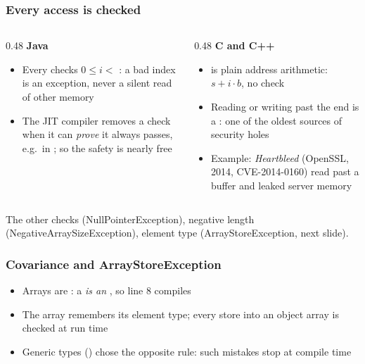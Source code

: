 \documentclass[aspectratio=169,10pt,compress]{beamer}
\begin{document}
\begin{frame}[t,fragile] \frametitle{Every access is checked}
	\begin{columns}[T]
		\begin{column}{0.48\textwidth}
			\textbf{Java}
			\begin{itemize}\small
				\item Every  checks $0 \le i <$ : a bad index is an
				      exception, never a silent read of other memory
				\item The JIT compiler removes a check when it can \emph{prove} it always passes,
				      e.g.\ in ; so the safety is nearly free
			\end{itemize}
		\end{column}
		\begin{column}{0.48\textwidth}
			\textbf{C and C++}
			\begin{itemize}\small
				\item {} is plain address arithmetic: $s + i \cdot b$, no check
				\item Reading or writing past the end is a :
				      one of the oldest sources of security holes
				\item Example: \emph{Heartbleed} (OpenSSL, 2014, CVE-2014-0160) read past a buffer
				      and leaked server memory
			\end{itemize}
		\end{column}
	\end{columns}

	\vspace{0.5em}
	\begin{block}{The other checks}
		\small {} (NullPointerException), negative length (NegativeArraySizeException),
		element type (ArrayStoreException, next slide).
	\end{block}
\end{frame}




\begin{frame}[t,fragile] \frametitle{Covariance and ArrayStoreException}

	\begin{itemize}\small
		\item<2-> Arrays are : a  \emph{is an} , so line 8 compiles
		\item<2-> The array remembers its element type; every store into an object array is checked at run time
		\item<2-> Generic types (\cisOOT) chose the opposite rule: such mistakes stop at compile time
	\end{itemize}
\end{frame}
\end{document}
